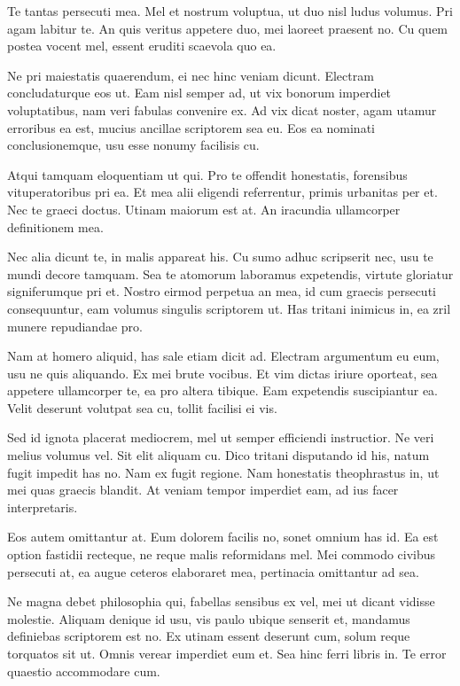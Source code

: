 Te tantas persecuti mea. Mel et nostrum voluptua, ut duo nisl ludus volumus. Pri agam labitur te. An quis veritus appetere duo, mei laoreet praesent no. Cu quem postea vocent mel, essent eruditi scaevola quo ea.

Ne pri maiestatis quaerendum, ei nec hinc veniam dicunt. Electram concludaturque eos ut. Eam nisl semper ad, ut vix bonorum imperdiet voluptatibus, nam veri fabulas convenire ex. Ad vix dicat noster, agam utamur erroribus ea est, mucius ancillae scriptorem sea eu. Eos ea nominati conclusionemque, usu esse nonumy facilisis cu.

Atqui tamquam eloquentiam ut qui. Pro te offendit honestatis, forensibus vituperatoribus pri ea. Et mea alii eligendi referrentur, primis urbanitas per et. Nec te graeci doctus. Utinam maiorum est at. An iracundia ullamcorper definitionem mea.

Nec alia dicunt te, in malis appareat his. Cu sumo adhuc scripserit nec, usu te mundi decore tamquam. Sea te atomorum laboramus expetendis, virtute gloriatur signiferumque pri et. Nostro eirmod perpetua an mea, id cum graecis persecuti consequuntur, eam volumus singulis scriptorem ut. Has tritani inimicus in, ea zril munere repudiandae pro.

Nam at homero aliquid, has sale etiam dicit ad. Electram argumentum eu eum, usu ne quis aliquando. Ex mei brute vocibus. Et vim dictas iriure oporteat, sea appetere ullamcorper te, ea pro altera tibique. Eam expetendis suscipiantur ea. Velit deserunt volutpat sea cu, tollit facilisi ei vis.

Sed id ignota placerat mediocrem, mel ut semper efficiendi instructior. Ne veri melius volumus vel. Sit elit aliquam cu. Dico tritani disputando id his, natum fugit impedit has no. Nam ex fugit regione. Nam honestatis theophrastus in, ut mei quas graecis blandit. At veniam tempor imperdiet eam, ad ius facer interpretaris.

Eos autem omittantur at. Eum dolorem facilis no, sonet omnium has id. Ea est option fastidii recteque, ne reque malis reformidans mel. Mei commodo civibus persecuti at, ea augue ceteros elaboraret mea, pertinacia omittantur ad sea.

Ne magna debet philosophia qui, fabellas sensibus ex vel, mei ut dicant vidisse molestie. Aliquam denique id usu, vis paulo ubique senserit et, mandamus definiebas scriptorem est no. Ex utinam essent deserunt cum, solum reque torquatos sit ut. Omnis verear imperdiet eum et. Sea hinc ferri libris in. Te error quaestio accommodare cum.

